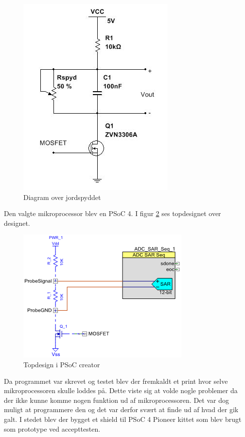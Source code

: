 \begin{figure}[H]
	\centering 
	\includegraphics[scale=0.8]{Projektbeskrivelse/DesignOgImplementeringAfHW/Jordfugt_billeder/jordspyd.JPG}
	\caption{Diagram over jordspyddet}
	\label{photo:jordspyd_diagram}
\end{figure} 

Den valgte mikroprocessor blev en PSoC 4. I figur \ref{photo:PSoC_Creator} ses topdesignet over designet. 

\begin{figure}[H]
	\centering 
	\includegraphics[scale=0.8]{Projektbeskrivelse/DesignOgImplementeringAfHW/Jordfugt_billeder/SAR_converter.png}
	\caption{Topdesign i PSoC creator}
	\label{photo:PSoC_Creator}
\end{figure} 

Da programmet var skrevet og testet blev der fremkaldt et print hvor selve mikroprocessoren skulle loddes på. Dette viste sig at volde nogle problemer da der ikke kunne komme nogen funktion ud af mikroprocessoren. Det var dog muligt at programmere den og det var derfor svært at finde ud af hvad der gik galt. I stedet blev der bygget et shield til PSoC 4 Pioneer kittet som blev brugt som prototype ved accepttesten. 


